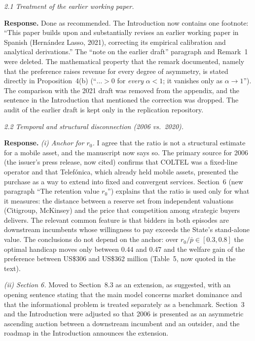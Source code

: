 \documentclass[11pt,a4paper]{article}
\newcommand{\rep}[1]{\par\smallskip\noindent\textbf{Response.} #1\par\bigskip}
\newcommand{\com}[1]{\par\medskip\noindent\textit{#1}\par}
\begin{document}
\com{2.1 Treatment of the earlier working paper.}
\rep{Done as recommended. The Introduction now contains one footnote: ``This paper builds upon and substantially revises an earlier working paper in Spanish (Hern\'andez Lasso, 2021), correcting its empirical calibration and analytical derivations.'' The ``note on the earlier draft'' paragraph and Remark~1 were deleted. The mathematical property that the remark documented, namely that the preference raises revenue for every degree of asymmetry, is stated directly in Proposition~4(b) (``$\ldots>0$ for \emph{every} $\alpha<1$; it vanishes only as $\alpha\to1$''). The comparison with the 2021 draft was removed from the appendix, and the sentence in the Introduction that mentioned the correction was dropped. The audit of the earlier draft is kept only in the replication repository.}

\com{2.2 Temporal and structural disconnection (2006 vs.\ 2020).}
\rep{\emph{(i) Anchor for $r_0$.} I agree that the ratio is not a structural estimate for a mobile asset, and the manuscript now says so. The primary source for 2006 (the issuer's press release, now cited) confirms that COLTEL was a fixed-line operator and that Telef\'onica, which already held mobile assets, presented the purchase as a way to extend into fixed and convergent services. Section~6 (new paragraph ``The retention value $r_0$'') explains that the ratio is used only for what it measures: the distance between a reserve set from independent valuations (Citigroup, McKinsey) and the price that competition among strategic buyers delivers. The relevant common feature is that bidders in both episodes are downstream incumbents whose willingness to pay exceeds the State's stand-alone value. The conclusions do not depend on the anchor: over $r_0/\bar p\in[0.3,0.8]$ the optimal handicap moves only between 0.44 and 0.47 and the welfare gain of the preference between US\$306 and US\$362 million (Table~5, now quoted in the text).

\emph{(ii) Section 6.} Moved to Section~8.3 as an extension, as suggested, with an opening sentence stating that the main model concerns market dominance and that the informational problem is treated separately as a benchmark. Section~3 and the Introduction were adjusted so that 2006 is presented as an asymmetric ascending auction between a downstream incumbent and an outsider, and the roadmap in the Introduction announces the extension.}
\end{document}
